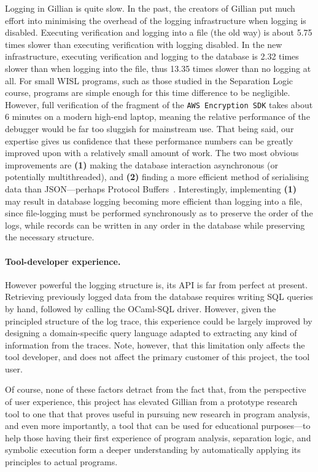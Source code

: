 Logging in Gillian is quite slow. In the past, the creators of Gillian put much
effort into minimising the overhead of the logging infrastructure when logging
is disabled. Executing verification and logging into a file (the old way) is
about 5.75\footnotemark[1]{} times slower than executing verification with
logging disabled. In the new infrastructure, executing verification and logging
to the database is 2.32\footnotemark[1]{} times slower than when logging into
the file, thus 13.35\footnotemark[1]{} times slower than no logging at all.
For small WISL programs, such as those studied in the Separation Logic course,
programs are simple enough for this time difference to be negligible. However,
full verification of the fragment of the \texttt{AWS Encryption SDK} takes about
6 minutes on a modern high-end laptop, meaning the relative performance of the
debugger would be far too sluggish for mainstream use.  That being said,
our expertise gives us confidence that these performance numbers can be
greatly improved upon with a relatively small amount of work.
The two most obvious improvements are \textbf{(1)} making the database
interaction asynchronous (or potentially multithreaded), and \textbf{(2)}
finding a more efficient method of serialising data than JSON---perhaps
Protocol Buffers~\cite{protobuf}. Interestingly, implementing \textbf{(1)} may
result in database logging becoming more efficient than logging into a file,
since file-logging must be performed synchronously as to preserve the order of
the logs, while records can be written in any order in the database while
preserving the necessary structure.

\paragraph{Tool-developer experience.}
However powerful the logging structure is, its API is far from perfect at
present. Retrieving previously logged data from the database requires writing
SQL queries by hand, followed by calling the OCaml-SQL driver. However, given
the principled structure of the log trace, this experience could be largely
improved by designing a domain-specific query language adapted to extracting any
kind of information from the traces. Note, however, that this limitation only
affects the tool developer, and does not affect the primary customer of this
project, the tool user.

Of course, none of these factors detract from the fact that, from the
perspective of user experience, this project has elevated Gillian from a
prototype research tool to one that that proves useful in pursuing new research
in program analysis, and even more importantly, a tool that can be used for
educational purposes---to help those having their first experience of
program analysis, separation logic, and symbolic execution form a deeper
understanding by automatically applying its principles to actual programs.
